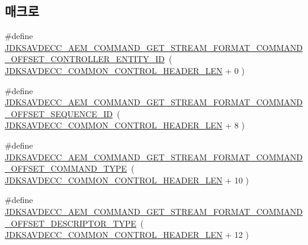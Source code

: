\subsection*{매크로}
\begin{DoxyCompactItemize}
\item 
\#define \hyperlink{group__command__get__stream__format_ga77c33685cfa72128b2a2fef4a9c9fbe8}{J\+D\+K\+S\+A\+V\+D\+E\+C\+C\+\_\+\+A\+E\+M\+\_\+\+C\+O\+M\+M\+A\+N\+D\+\_\+\+G\+E\+T\+\_\+\+S\+T\+R\+E\+A\+M\+\_\+\+F\+O\+R\+M\+A\+T\+\_\+\+C\+O\+M\+M\+A\+N\+D\+\_\+\+O\+F\+F\+S\+E\+T\+\_\+\+C\+O\+N\+T\+R\+O\+L\+L\+E\+R\+\_\+\+E\+N\+T\+I\+T\+Y\+\_\+\+ID}~( \hyperlink{group__jdksavdecc__avtp__common__control__header_gaae84052886fb1bb42f3bc5f85b741dff}{J\+D\+K\+S\+A\+V\+D\+E\+C\+C\+\_\+\+C\+O\+M\+M\+O\+N\+\_\+\+C\+O\+N\+T\+R\+O\+L\+\_\+\+H\+E\+A\+D\+E\+R\+\_\+\+L\+EN} + 0 )
\item 
\#define \hyperlink{group__command__get__stream__format_ga7be1e01fd39c4e7a8255fecd2b5722d3}{J\+D\+K\+S\+A\+V\+D\+E\+C\+C\+\_\+\+A\+E\+M\+\_\+\+C\+O\+M\+M\+A\+N\+D\+\_\+\+G\+E\+T\+\_\+\+S\+T\+R\+E\+A\+M\+\_\+\+F\+O\+R\+M\+A\+T\+\_\+\+C\+O\+M\+M\+A\+N\+D\+\_\+\+O\+F\+F\+S\+E\+T\+\_\+\+S\+E\+Q\+U\+E\+N\+C\+E\+\_\+\+ID}~( \hyperlink{group__jdksavdecc__avtp__common__control__header_gaae84052886fb1bb42f3bc5f85b741dff}{J\+D\+K\+S\+A\+V\+D\+E\+C\+C\+\_\+\+C\+O\+M\+M\+O\+N\+\_\+\+C\+O\+N\+T\+R\+O\+L\+\_\+\+H\+E\+A\+D\+E\+R\+\_\+\+L\+EN} + 8 )
\item 
\#define \hyperlink{group__command__get__stream__format_gacf8611691f6a02121571006741946f60}{J\+D\+K\+S\+A\+V\+D\+E\+C\+C\+\_\+\+A\+E\+M\+\_\+\+C\+O\+M\+M\+A\+N\+D\+\_\+\+G\+E\+T\+\_\+\+S\+T\+R\+E\+A\+M\+\_\+\+F\+O\+R\+M\+A\+T\+\_\+\+C\+O\+M\+M\+A\+N\+D\+\_\+\+O\+F\+F\+S\+E\+T\+\_\+\+C\+O\+M\+M\+A\+N\+D\+\_\+\+T\+Y\+PE}~( \hyperlink{group__jdksavdecc__avtp__common__control__header_gaae84052886fb1bb42f3bc5f85b741dff}{J\+D\+K\+S\+A\+V\+D\+E\+C\+C\+\_\+\+C\+O\+M\+M\+O\+N\+\_\+\+C\+O\+N\+T\+R\+O\+L\+\_\+\+H\+E\+A\+D\+E\+R\+\_\+\+L\+EN} + 10 )
\item 
\#define \hyperlink{group__command__get__stream__format_ga596cf49460feaef4da969ff2f9bd5df5}{J\+D\+K\+S\+A\+V\+D\+E\+C\+C\+\_\+\+A\+E\+M\+\_\+\+C\+O\+M\+M\+A\+N\+D\+\_\+\+G\+E\+T\+\_\+\+S\+T\+R\+E\+A\+M\+\_\+\+F\+O\+R\+M\+A\+T\+\_\+\+C\+O\+M\+M\+A\+N\+D\+\_\+\+O\+F\+F\+S\+E\+T\+\_\+\+D\+E\+S\+C\+R\+I\+P\+T\+O\+R\+\_\+\+T\+Y\+PE}~( \hyperlink{group__jdksavdecc__avtp__common__control__header_gaae84052886fb1bb42f3bc5f85b741dff}{J\+D\+K\+S\+A\+V\+D\+E\+C\+C\+\_\+\+C\+O\+M\+M\+O\+N\+\_\+\+C\+O\+N\+T\+R\+O\+L\+\_\+\+H\+E\+A\+D\+E\+R\+\_\+\+L\+EN} + 12 )

\end{DoxyCompactItemize}
